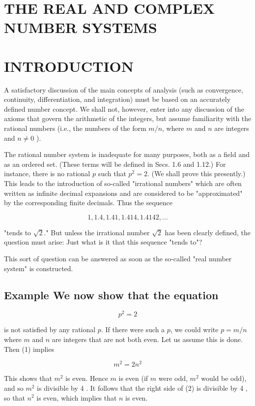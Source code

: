 \documentclass[10pt]{article}
\begin{document}
\section{THE REAL AND COMPLEX NUMBER SYSTEMS}
\section{INTRODUCTION}
A satisfactory discussion of the main concepts of analysis (such as convergence, continuity, differentiation, and integration) must be based on an accurately defined number concept. We shall not, however, enter into any discussion of the axioms that govern the arithmetic of the integers, but assume familiarity with the rational numbers (i.e., the numbers of the form $m / n$, where $m$ and $n$ are integers and $n \neq 0$ ).

The rational number system is inadequate for many purposes, both as a field and as an ordered set. (These terms will be defined in Secs. 1.6 and 1.12.) For instance, there is no rational $p$ such that $p^{2}=2$. (We shall prove this presently.) This leads to the introduction of so-called "irrational numbers" which are often written as infinite decimal expansions and are considered to be "approximated" by the corresponding finite decimals. Thus the sequence

$$
1,1.4,1.41,1.414,1.4142, \ldots
$$

"tends to $\sqrt{2}$." But unless the irrational number $\sqrt{2}$ has been clearly defined, the question must arise: Just what is it that this sequence "tends to"?

This sort of question can be answered as soon as the so-called "real number system" is constructed.

\subsection{Example We now show that the equation}
$$
p^{2}=2
$$

is not satisfied by any rational $p$. If there were such a $p$, we could write $p=m / n$ where $m$ and $n$ are integers that are not both even. Let us assume this is done. Then (1) implies

$$
m^{2}=2 n^{2}
$$

This shows that $m^{2}$ is even. Hence $m$ is even (if $m$ were odd, $m^{2}$ would be odd), and so $m^{2}$ is divisible by 4 . It follows that the right side of (2) is divisible by 4 , so that $n^{2}$ is even, which implies that $n$ is even.
\end{document}

